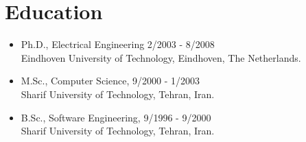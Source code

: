 \section{Education} 
\begin{itemize}
\item Ph.D., Electrical Engineering \hfill 2/2003 - 8/2008 \\
Eindhoven University of Technology, Eindhoven, The Netherlands. \\
\item M.Sc., Computer Science, \hfill 9/2000 - 1/2003  \\
Sharif University of Technology, Tehran, Iran.\\ 
\item B.Sc., Software Engineering, \hfill 9/1996 - 9/2000  \\
Sharif University of Technology, Tehran, Iran.
\end{itemize}

